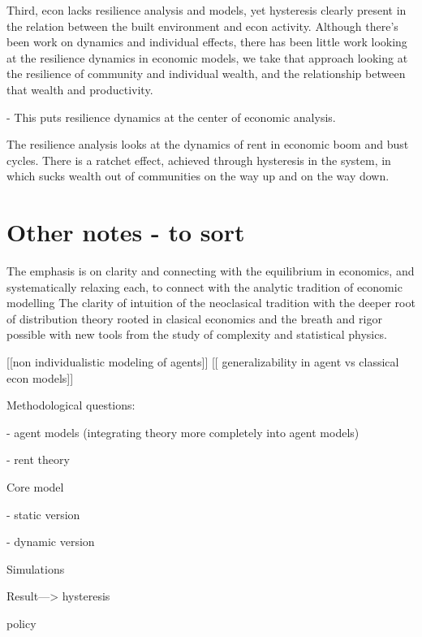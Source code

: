 Third, econ lacks resilience analysis and models, yet hysteresis clearly present in the relation between the built environment and econ activity. Although there's been work on dynamics and individual effects, there has been little work looking at the resilience dynamics in economic models, we take that approach looking at the resilience of community and individual wealth, and the relationship between that wealth and productivity. 

- This puts resilience dynamics at the center of economic analysis.

The resilience analysis looks at the dynamics of rent in economic boom and bust cycles.
There is a ratchet effect, achieved through hysteresis in the system, in which sucks wealth out of communities on the way up and on the way down. %


\section{Other notes - to sort}
The emphasis is on clarity and connecting with the equilibrium in economics, and systematically relaxing each, to connect with the analytic tradition of economic modelling
The clarity of intuition of the neoclasical tradition with the deeper root of distribution theory rooted in clasical economics and the breath and rigor possible with new tools from the study of complexity and statistical physics.



[[non individualistic modeling of agents]] 
[[ generalizability in agent vs classical econ models]]

Methodological questions: 

    - agent models (integrating theory more completely into agent models)
    
    - rent theory

Core model

    - static version
    
    - dynamic version

Simulations

Result---> hysteresis

policy